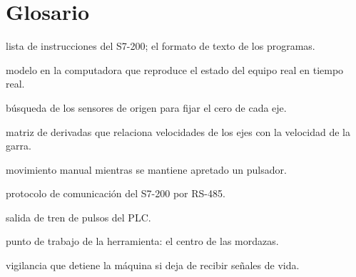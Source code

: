 \documentclass[a4paper,11pt]{article}
\begin{document}
\section{Glosario}
\begin{description}[leftmargin=3.2cm, style=nextline]
\item[AWL] lista de instrucciones del S7-200; el formato de texto de los programas.
\item[Gemelo digital] modelo en la computadora que reproduce el estado del equipo real en tiempo real.
\item[Homing] búsqueda de los sensores de origen para fijar el cero de cada eje.
\item[Jacobiano] matriz de derivadas que relaciona velocidades de los ejes con la velocidad de la garra.
\item[Jog] movimiento manual mientras se mantiene apretado un pulsador.
\item[PPI] protocolo de comunicación del S7-200 por RS-485.
\item[PTO] salida de tren de pulsos del PLC.
\item[TCP] punto de trabajo de la herramienta: el centro de las mordazas.
\item[Watchdog] vigilancia que detiene la máquina si deja de recibir señales de vida.
\end{description}
\end{document}
